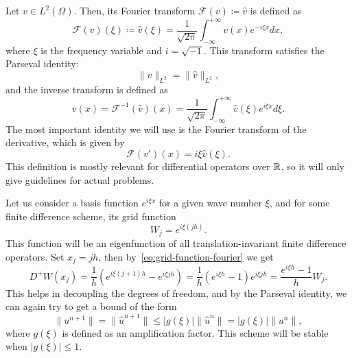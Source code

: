 \begin{definition}\label{def:fourier-transform}
    Let $v\in L^2(\Omega)$. Then, its Fourier transform $\mathcal{F}(v)  \coloneqq  \hat{v}$ is defined as
    \begin{equation}\label{eq:fourier-transform}
        \mathcal{F}(v)(\xi)  \coloneqq  \hat{v}(\xi) = \frac{1}{\sqrt{2\pi}}\int_{-\infty}^{+\infty} v(x)e^{-i\xi x}dx,
    \end{equation}
    where $\xi$ is the frequency variable and $i=\sqrt{-1}$. This transform satisfies the Parseval identity:
    \begin{equation}\label{eq:parseval}
    \| v\|_{L^2} = \| \hat{v}\|_{L^2},
    \end{equation}
    and the inverse transform is defined as
    \begin{equation}\label{eq:inverse-fourier-transform}
        v(x) = \mathcal{F}^{-1}(\hat{v})(x) = \frac{1}{\sqrt{2\pi}}\int_{-\infty}^{+\infty} \hat{v}(\xi)e^{i\xi x}d\xi.
    \end{equation}
    The most important identity we will use is the Fourier transform of the derivative, which is given by
    \begin{equation}\label{eq:fourier-transform-derivative}
        \mathcal{F}(v')(x) = i\xi \hat{v}(\xi).
    \end{equation}
    This definition is mostly relevant for differential operators over $\mathbb{R}$, so it will only give guidelines for actual problems.
\end{definition}
Let us consider a basis function $e^{i\xi x}$ for a given wave number $\xi$, and for some finite difference scheme, its grid function
\begin{equation}\label{eq:grid-function-fourier}
    W_j = e^{i\xi (jh)}.
\end{equation}
This function will be an eigenfunction of all translation-invariant finite difference operators. Set $x_j = jh$, then by~\ref{eq:grid-function-fourier} we get
\begin{equation*}
D^+ W(x_j) = \frac{1}{h}\left(e^{i\xi (j+1)h} - e^{i\xi j h}\right) = \frac{1}{h}\left(e^{i\xi h} - 1\right)e^{i\xi j h} = \frac{e^{i\xi h} - 1}{h}W_j.
\end{equation*}
This helps in decoupling the degrees of freedom, and by the Parseval identity, we can again try to get a bound of the form
\begin{equation*}
\|u^{n+1}\| = \|\hat{u}^{n+1}\|\leq |g(\xi)| \|\hat{u}^{n}\| = |g(\xi)| \|u^n\|,
\end{equation*}
where $g(\xi)$ is defined as an amplification factor. This scheme will be stable when $|g(\xi)|\leq 1$.

